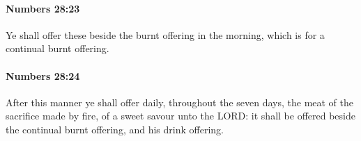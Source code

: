 		\paragraph{Numbers 28:23} %
			\label{NUMBERS-28-23}

			Ye shall offer these beside the burnt offering in the morning, which is for a continual burnt offering.


		\paragraph{Numbers 28:24} %
			\label{NUMBERS-28-24}

			After this manner ye shall offer daily, throughout the seven days, the meat of the sacrifice made by fire, of a sweet savour unto the LORD: it shall be offered beside the continual burnt offering, and his drink offering.


